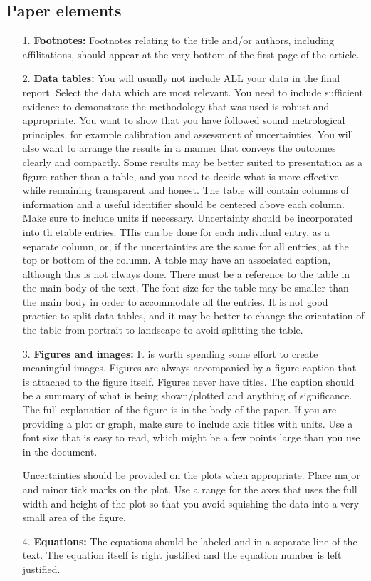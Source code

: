 \subsection{Paper elements}

\begin{itemize}
    \item[1.] \textbf{Footnotes:} Footnotes relating to the title and/or authors, including affilitations, should appear at the very bottom of the first page of the article.
    \item[2.] \textbf{Data tables:} You will usually not include ALL your data in the final report. Select the data which are most relevant. You need to include sufficient evidence to demonstrate the methodology that was used is robust and appropriate. You want to show that you have followed sound metrological principles, for example calibration and assessment of uncertainties. You will also want to arrange the results in a manner that conveys the outcomes clearly and compactly. Some results may be better suited to presentation as a figure rather than a table, and you need to decide what is more effective while remaining transparent and honest.
        The table will contain columns of information and a useful identifier should be centered above each column. Make sure to include units if necessary. Uncertainty should be incorporated into th etable entries. THis can be done for each individual entry, as a separate column, or, if the uncertainties are the same for all entries, at the top or bottom of the column. A table may have an associated caption, although this is not always done. There must be a reference to the table in the main body of the text. The font size for the table may be smaller than the main body in order to accommodate all the entries. It is not good practice to split data tables, and it may be better to change the orientation of the table from portrait to landscape to avoid splitting the table.
    \item[3.] \textbf{Figures and images:} It is worth spending some effort to create meaningful images. Figures are always accompanied by a figure caption that is attached to the figure itself. Figures never have titles. The caption should be a summary of what is being shown/plotted and anything of significance. The full explanation of the figure is in the body of the paper. If you are providing a plot or graph, make sure to include axis titles with units. Use a font size that is easy to read, which might be a few points large than you use in the document. 

        Uncertainties should be provided on the plots when appropriate. Place major and minor tick marks on the plot. Use a range for the axes that uses the full width and height of the plot so that you avoid squishing the data into a very small area of the figure.
    \item[4.] \textbf{Equations:} The equations should be labeled and in a separate line of the text. The equation itself is right justified and the equation number is left justified. 
\end{itemize}

